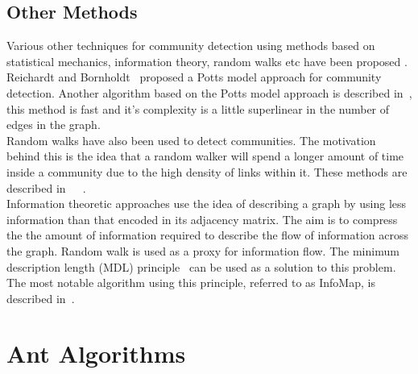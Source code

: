 \begin{spacing}{1.5}
\subsection{Other Methods}

Various other techniques for community detection using methods based on statistical mechanics, information theory, random walks etc  have been proposed . \\
\indent Reichardt and Bornholdt~\cite{PhysRevLett.93.218701} proposed a Potts model approach for community detection. Another algorithm based on the Potts model approach is described in~\cite{PhysRevE.81.046114}, this method is fast and it's complexity is a little superlinear in the number of edges in the graph.\\
\indent Random walks have also been used to detect communities. The motivation behind this is the idea that a random walker will spend a longer amount of time inside a community due to the high density of links within it. These methods are described in~\cite{PhysRevE.67.041908}~\cite{ponslatapy05}~\cite{vandongen00}. \\
\indent Information theoretic approaches use the idea of describing a graph by using less information than that encoded in its adjacency matrix. The aim is to compress the the amount of information required to describe the flow of information across the graph. Random walk is used as a proxy for information flow. The minimum description length (MDL) principle~\cite{Rissanen1978465} can be used as a solution to this problem. The most notable algorithm using this principle, referred to as InfoMap, is described in~\cite{Rosvall29012008}.\\

\section{Ant Algorithms}


\end{spacing}
